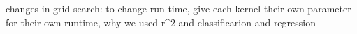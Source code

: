 changes in grid search: to change run time, give each kernel their own parameter for their own runtime, 
why we used r^2 and classificarion and regression





